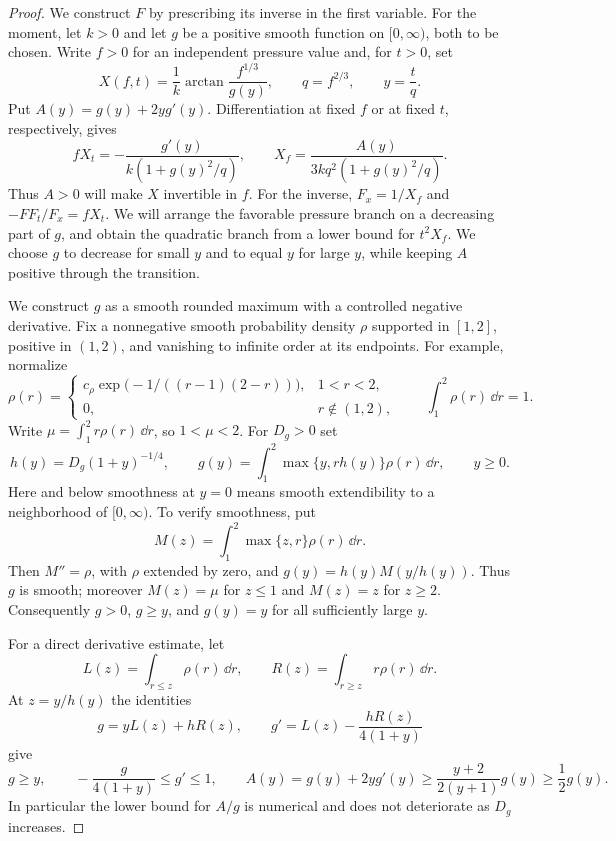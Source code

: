 \begin{proof}
We construct $F$ by prescribing its inverse in the first variable. For
the moment, let $k>0$ and let $g$ be a positive smooth function on
$[0,\infty)$, both to be chosen. Write $f>0$ for an independent pressure
value and, for $t>0$, set
\begin{equation}\label{pressure:inverse}
 X(f,t)=\frac1k\arctan\frac{f^{1/3}}{g(y)},\qquad
 q=f^{2/3},\qquad y=\frac tq.
\end{equation}
Put $A(y)=g(y)+2yg'(y)$. Differentiation at fixed $f$ or at fixed $t$,
respectively, gives
\begin{equation}\label{pressure:inverse-derivatives}
 fX_t=-\frac{g'(y)}{k(1+g(y)^2/q)},\qquad
 X_f=\frac{A(y)}{3kq^2(1+g(y)^2/q)}.
\end{equation}
Thus $A>0$ will make $X$ invertible in $f$. For the inverse,
$F_x=1/X_f$ and $-FF_t/F_x=fX_t$. We will arrange the favorable
pressure branch on a decreasing part of $g$, and obtain the quadratic
branch from a lower bound for $t^2X_f$. We choose $g$ to decrease for
small $y$ and to equal $y$ for large $y$, while keeping $A$ positive
through the transition.

We construct $g$ as a smooth rounded maximum with a controlled negative
derivative.  Fix a nonnegative smooth probability density $\rho$ supported
in $[1,2]$, positive in $(1,2)$, and vanishing to infinite order at its
endpoints.  For example, normalize
\[
 \rho(r)=
 \begin{cases}
 c_\rho\exp\bigl(-1/((r-1)(2-r))\bigr),&1<r<2,\\
 0,&r\notin(1,2),
 \end{cases}
 \qquad \int_1^2\rho(r)\,\dd r=1.
\]
Write $\mu=\int_1^2r\rho(r)\,\dd r$, so $1<\mu<2$.  For $D_g>0$ set
\begin{equation}\label{pressure:rounded-max}
 h(y)=D_g(1+y)^{-1/4},\qquad
 g(y)=\int_1^2\max\{y,rh(y)\}\rho(r)\,\dd r,
 \qquad y\ge0.
\end{equation}
Here and below smoothness at $y=0$ means smooth extendibility to a
neighborhood of $[0,\infty)$.  To verify smoothness, put
\[
 M(z)=\int_1^2\max\{z,r\}\rho(r)\,\dd r.
\]
Then $M''=\rho$, with $\rho$ extended by zero, and
$g(y)=h(y)M(y/h(y))$.  Thus $g$ is smooth; moreover $M(z)=\mu$ for
$z\le1$ and $M(z)=z$ for $z\ge2$.  Consequently $g>0$, $g\ge y$, and
$g(y)=y$ for all sufficiently large $y$.

For a direct derivative estimate, let
\[
 L(z)=\int_{r\le z}\rho(r)\,\dd r,
 \qquad R(z)=\int_{r\ge z}r\rho(r)\,\dd r.
\]
At $z=y/h(y)$ the identities
\[
 g=yL(z)+hR(z),\qquad
 g'=L(z)-\frac{hR(z)}{4(1+y)}
\]
give
\begin{equation}\label{pressure:g-bounds}
 g\ge y,\qquad
 -\frac{g}{4(1+y)}\le g'\le1,\qquad
 A(y)=g(y)+2yg'(y)\ge\frac{y+2}{2(y+1)}g(y)\ge\frac12g(y).
\end{equation}
In particular the lower bound for $A/g$ is numerical and does not
deteriorate as $D_g$ increases.


\end{proof}
